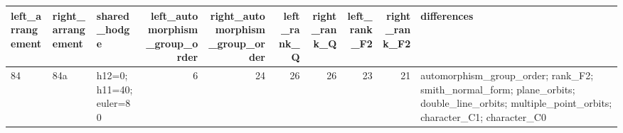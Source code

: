 \begin{tabular}{lllrrrrrrl}
\toprule
left_arrangement & right_arrangement & shared_hodge & left_automorphism_group_order & right_automorphism_group_order & left_rank_Q & right_rank_Q & left_rank_F2 & right_rank_F2 & differences \\
\midrule
84 & 84a & h12=0;h11=40;euler=80 & 6 & 24 & 26 & 26 & 23 & 21 & automorphism_group_order; rank_F2; smith_normal_form; plane_orbits; double_line_orbits; multiple_point_orbits; character_C1; character_C0 \\
\bottomrule
\end{tabular}
